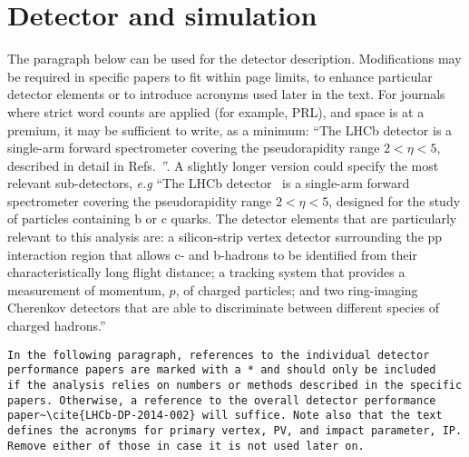 \section{Detector and simulation}
\label{sec:Detector}
The paragraph below can be used for the detector
description. Modifications may be required in specific papers to fit
within page limits, to enhance particular detector elements or to
introduce acronyms used later in the text. For journals where strict
word counts are applied (for example, PRL), and space is at a premium,
it may be sufficient to write, as a minimum: ``The LHCb detector is a 
single-arm forward spectrometer covering the pseudorapidity range 
$2 < \eta < 5$, 
described in detail in Refs.~\cite{Alves:2008zz,LHCb-DP-2014-002}''. 
A slightly longer version could specify the most relevant sub-detectors, {\it e.g} 
``The LHCb 
detector~\cite{Alves:2008zz,LHCb-DP-2014-002} is a
single-arm forward spectrometer covering the pseudorapidity range $2 < \eta < 5$, designed for
the study of particles containing b or c quarks. The detector elements that are particularly
relevant to this analysis are: a silicon-strip vertex detector surrounding the pp interaction
region that allows c- and b-hadrons to be identified from their characteristically long
flight distance; a tracking system that provides a measurement of momentum, $p$, of charged
particles; and two ring-imaging Cherenkov detectors that are able to discriminate between
different species of charged hadrons.'' 

\begin{verbatim}
In the following paragraph, references to the individual detector 
performance papers are marked with a * and should only be included 
if the analysis relies on numbers or methods described in the specific 
papers. Otherwise, a reference to the overall detector performance 
paper~\cite{LHCb-DP-2014-002} will suffice. Note also that the text 
defines the acronyms for primary vertex, PV, and impact parameter, IP. 
Remove either of those in case it is not used later on.
\end{verbatim}

